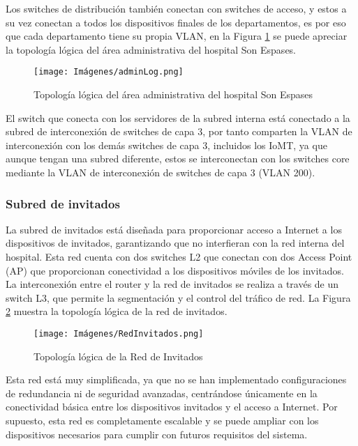 Los switches de distribución también conectan con switches de acceso, y estos a su vez conectan a todos los dispositivos finales de los departamentos, es por eso que cada departamento 
tiene su propia VLAN, en la Figura \ref{fig:adminLog} se puede apreciar la topología lógica del área administrativa del hospital Son Espases.
\begin{figure}[H]
    \centering
    \texttt{[image: Imágenes/adminLog.png]}
    \caption{Topología lógica del área administrativa del hospital Son Espases}
    \label{fig:adminLog}
\end{figure}

El switch que conecta con los servidores de la subred interna está conectado a la subred de interconexión de switches de capa 3, por tanto comparten la VLAN de interconexión con los demás switches de capa 3, incluidos los IoMT, ya que aunque tengan 
una subred diferente, estos se interconectan con los switches core mediante la VLAN de interconexión de switches de capa 3 (VLAN 200).

\subsubsection{Subred de invitados}
La subred de invitados está diseñada para proporcionar acceso a Internet a los dispositivos de invitados, garantizando que no interfieran con la red interna del hospital. Esta red 
cuenta con dos switches L2 que conectan con dos Access Point (AP) que proporcionan conectividad a los dispositivos móviles de los invitados. La interconexión entre 
el router y la red de invitados se realiza a través de un switch L3, que permite la segmentación y el control del tráfico de red. La Figura \ref{fig:RedInvitados} muestra la topología 
lógica de la red de invitados.
\begin{figure}[H]
    \centering
    \texttt{[image: Imágenes/RedInvitados.png]}
    \caption{Topología lógica de la Red de Invitados}
    \label{fig:RedInvitados}
\end{figure}

Esta red está muy simplificada, ya que no se han implementado configuraciones de redundancia ni de seguridad avanzadas, centrándose únicamente en la conectividad básica entre los dispositivos 
invitados y el acceso a Internet. Por supuesto, esta red es completamente escalable y se puede ampliar con los dispositivos necesarios para cumplir con futuros requisitos del sistema.

